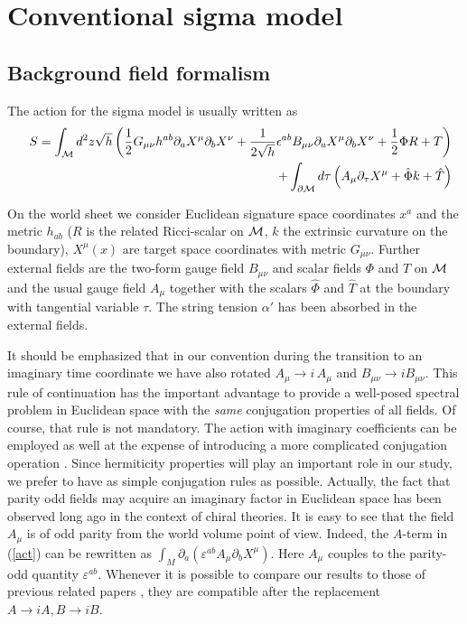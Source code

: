 \documentclass[a4paper,12pt]{article}
\begin{document}
\section{Conventional sigma model }

\subsection{Background field formalism}


The action for the sigma model  is usually written as 
\begin{eqnarray}
&&S= \int _{\cal M}d^{2}z\sqrt{h}
\left(\frac{1}{2} G_{\mu\nu} h^{ab}
\partial _{a}X^{\mu }\partial _{b}X^{\nu }
+\frac{1}{2\sqrt{h}}\epsilon^{ab}B_{\mu\nu}
\partial _{a}X^{\mu }\partial _{b}X^{\nu } +\frac 12 \Phi R +T \right)
\nonumber \\
&&\qquad+\int _{\partial {\cal M}}d\tau \left(
 A_{\mu }\partial _{\tau }
X^{\mu } +\hat\Phi k +\hat{T} 
\right) \label{act}
\end{eqnarray}

On the world sheet we consider Euclidean signature space coordinates 
$x^a$ and the metric $h_{ab}$ ($R$ is the related Ricci-scalar 
on ${\cal M}$, $k$ the extrinsic curvature on the boundary), 
$X^\mu (x)$ are target space coordinates with metric 
$G_{\mu\nu}$. Further external fields are the two-form gauge 
field $B_{\mu\nu}$ and scalar fields $\Phi$ and $T$ on ${\cal M}$ 
and the usual gauge field $A_\mu$ together with the scalars 
$\hat\Phi$ and $\hat T$ at the boundary with tangential 
variable $\tau$. The string tension $\alpha'$ has been
absorbed in the external fields.

It should be emphasized that in our convention during the 
transition to an imaginary time coordinate we have also 
rotated $A_\mu \to i\, A_\mu$ and $B_{\mu\nu}\to iB_{\mu\nu}$. 
This rule of continuation has 
the important advantage to provide a well-posed spectral 
problem in Euclidean space with the {\em same} conjugation 
properties of all fields. Of course, that rule is not 
mandatory. The action with imaginary
coefficients can be employed as well
 at the expense of introducing a more complicated
conjugation operation \cite{Osborn91}. Since hermiticity
properties will play an important role in our study, we prefer
to have as simple conjugation rules as possible. Actually,
the fact that parity odd fields may acquire an imaginary factor 
in Euclidean space has been observed long ago \cite{AB} in 
the context of chiral theories. It is easy to see that the 
field $A_\mu$ is of odd parity from the world volume point 
of view. Indeed, the $A$-term in (\ref{act}) can be rewritten as 
$\int_M \partial_a (\varepsilon^{ab} A_\mu \partial_b 
X^\mu)$.  Here $A_\mu$ couples to the parity-odd quantity 
$\varepsilon^{ab}$. 
Whenever it is possible to compare our results to those of previous related
papers \cite{ACNY87,Callan88,Osborn91},
they are compatible after the replacement \( A\rightarrow iA,
B\rightarrow iB \).
\end{document}
